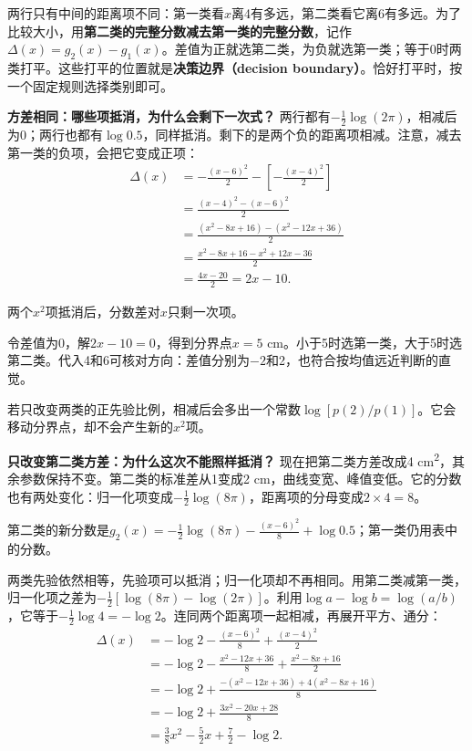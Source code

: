 两行只有中间的距离项不同：第一类看\(x\)离4有多远，第二类看它离6有多远。为了比较大小，用\textbf{第二类的完整分数减去第一类的完整分数}，记作\(\Delta(x)=g_2(x)-g_1(x)\)。差值为正就选第二类，为负就选第一类；等于0时两类打平。这些打平的位置就是\textbf{决策边界（decision boundary）}。恰好打平时，按一个固定规则选择类别即可。


\textbf{方差相同：哪些项抵消，为什么会剩下一次式？} 两行都有\(-\tfrac12\log(2\pi)\)，相减后为0；两行也都有\(\log0.5\)，同样抵消。剩下的是两个负的距离项相减。注意，减去第一类的负项，会把它变成正项：
\[
\begin{aligned}
\Delta(x)&=-\frac{(x-6)^2}{2}-\left[-\frac{(x-4)^2}{2}\right]\\
&=\frac{(x-4)^2-(x-6)^2}{2}\\
&=\frac{(x^2-8x+16)-(x^2-12x+36)}{2}\\
&=\frac{x^2-8x+16-x^2+12x-36}{2}\\
&=\frac{4x-20}{2}=2x-10.
\end{aligned}
\tag{2.14a}
\]


两个\(x^2\)项抵消后，分数差对\(x\)只剩一次项。


令差值为0，解\(2x-10=0\)，得到分界点\(x=5\) cm。小于5时选第一类，大于5时选第二类。代入4和6可核对方向：差值分别为\(-2\)和2，也符合按均值远近判断的直觉。


若只改变两类的正先验比例，相减后会多出一个常数\(\log[p(2)/p(1)]\)。它会移动分界点，却不会产生新的\(x^2\)项。


\textbf{只改变第二类方差：为什么这次不能照样抵消？} 现在把第二类方差改成4 cm\textsuperscript{2}，其余参数保持不变。第二类的标准差从1变成2 cm，曲线变宽、峰值变低。它的分数也有两处变化：归一化项变成\(-\tfrac12\log(8\pi)\)，距离项的分母变成\(2\times4=8\)。


第二类的新分数是\(g_2(x)=-\tfrac12\log(8\pi)-\tfrac{(x-6)^2}{8}+\log0.5\)；第一类仍用表中的分数。


两类先验依然相等，先验项可以抵消；归一化项却不再相同。用第二类减第一类，归一化项之差为\(-\tfrac12[\log(8\pi)-\log(2\pi)]\)。利用\(\log a-\log b=\log(a/b)\)，它等于\(-\tfrac12\log4=-\log2\)。连同两个距离项一起相减，再展开平方、通分：
\[
\begin{aligned}
\Delta(x)&=-\log2-\frac{(x-6)^2}{8}+\frac{(x-4)^2}{2}\\
&=-\log2-\frac{x^2-12x+36}{8}+\frac{x^2-8x+16}{2}\\
&=-\log2+\frac{-(x^2-12x+36)+4(x^2-8x+16)}{8}\\
&=-\log2+\frac{3x^2-20x+28}{8}\\
&=\frac38x^2-\frac52x+\frac72-\log2.
\end{aligned}
\tag{2.14b}
\]


